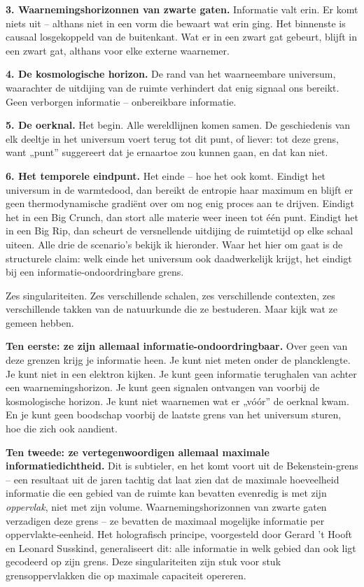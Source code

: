 \documentclass[11pt, twoside, openright]{book}
\begin{document}
\textbf{3. Waarnemingshorizonnen van zwarte gaten.} Informatie valt erin. Er komt niets uit -- althans niet in een vorm die bewaart wat erin ging. Het binnenste is causaal losgekoppeld van de buitenkant. Wat er in een zwart gat gebeurt, blijft in een zwart gat, althans voor elke externe waarnemer.

\textbf{4. De kosmologische horizon.} De rand van het waarneembare universum, waarachter de uitdijing van de ruimte verhindert dat enig signaal ons bereikt. Geen verborgen informatie -- onbereikbare informatie.

\textbf{5. De oerknal.} Het begin. Alle wereldlijnen komen samen. De geschiedenis van elk deeltje in het universum voert terug tot dit punt, of liever: tot deze grens, want „punt” suggereert dat je ernaartoe zou kunnen gaan, en dat kan niet.

\textbf{6. Het temporele eindpunt.} Het einde -- hoe het ook komt. Eindigt het universum in de warmtedood, dan bereikt de entropie haar maximum en blijft er geen thermodynamische gradiënt over om nog enig proces aan te drijven. Eindigt het in een Big Crunch, dan stort alle materie weer ineen tot één punt. Eindigt het in een Big Rip, dan scheurt de versnellende uitdijing de ruimtetijd op elke schaal uiteen. Alle drie de scenario's bekijk ik hieronder. Waar het hier om gaat is de structurele claim: welk einde het universum ook daadwerkelijk krijgt, het eindigt bij een informatie-ondoordringbare grens.

Zes singulariteiten. Zes verschillende schalen, zes verschillende contexten, zes verschillende takken van de natuurkunde die ze bestuderen. Maar kijk wat ze gemeen hebben.

\textbf{Ten eerste: ze zijn allemaal informatie-ondoordringbaar.} Over geen van deze grenzen krijg je informatie heen. Je kunt niet meten onder de plancklengte. Je kunt niet in een elektron kijken. Je kunt geen informatie terughalen van achter een waarnemingshorizon. Je kunt geen signalen ontvangen van voorbij de kosmologische horizon. Je kunt niet waarnemen wat er „vóór” de oerknal kwam. En je kunt geen boodschap voorbij de laatste grens van het universum sturen, hoe die zich ook aandient.

\textbf{Ten tweede: ze vertegenwoordigen allemaal maximale informatiedichtheid.} Dit is subtieler, en het komt voort uit de Bekenstein-grens -- een resultaat uit de jaren tachtig dat laat zien dat de maximale hoeveelheid informatie die een gebied van de ruimte kan bevatten evenredig is met zijn \textit{oppervlak}, niet met zijn volume. Waarnemingshorizonnen van zwarte gaten verzadigen deze grens -- ze bevatten de maximaal mogelijke informatie per oppervlakte-eenheid. Het holografisch principe, voorgesteld door Gerard 't Hooft en Leonard Susskind, generaliseert dit: alle informatie in welk gebied dan ook ligt gecodeerd op zijn grens. Deze singulariteiten zijn stuk voor stuk grensoppervlakken die op maximale capaciteit opereren.
\end{document}
